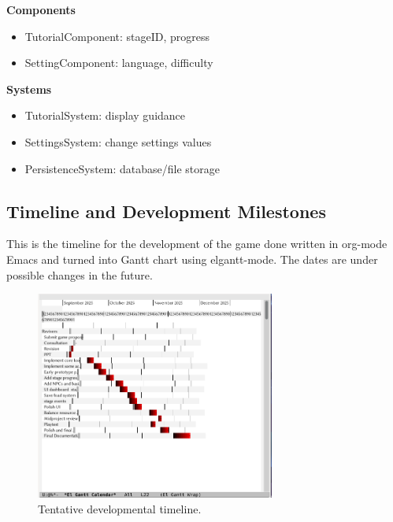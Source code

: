 \documentclass[11pt]{article}
\begin{document}
\textbf{Components}
\begin{itemize}
\item
  TutorialComponent: stageID, progress
\item
  SettingComponent: language, difficulty
\end{itemize}

\textbf{Systems}
\begin{itemize}
\item
  TutorialSystem: display guidance
\item
  SettingsSystem: change settings values
\item
  PersistenceSystem: database/file storage
\end{itemize}


\subsection{Timeline and Development Milestones}
This is the timeline for the development of the game done written in org-mode Emacs and turned into Gantt chart using elgantt-mode. The dates are under possible changes in the future.\\

\begin{figure}[H]
  \centering
  \includegraphics[width=0.7\textwidth]{images/elgantt.png}
  \caption{Tentative developmental timeline.}
  \label{fig:gantt}
\end{figure}
\end{document}
